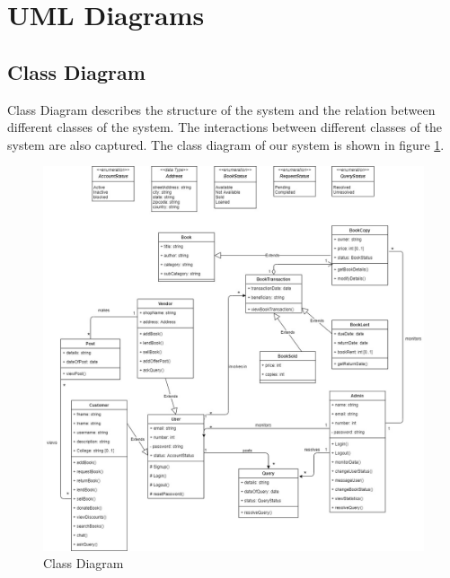 \documentclass[conference]{IEEEtran}
\begin{document}
\section{UML Diagrams}
\subsection{Class Diagram}
Class Diagram describes the structure of the system and the relation between different classes of the system. The interactions between different classes of the system are also captured. The class diagram of our system is shown in figure \ref{fig:classdiagram}. 
\begin{figure}[h]
     \centering
     \includegraphics[scale=0.20,margin=2,frame]{Class Diagram.jpg}
     \caption{Class Diagram}
     \label{fig:classdiagram}
 \end{figure}
\end{document}
